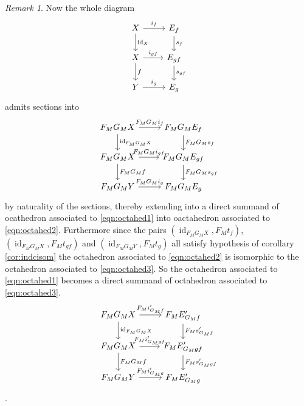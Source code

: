 \documentclass{article}
\DeclareMathOperator{\id}{id}
\theoremstyle{definition}
\theoremstyle{remark}
\newtheorem{remark}[theorem]{Remark}
\begin{document}
\begin{remark}
    Now the whole diagram 
    \begin{equation} \label{eqn:octahed1}
       \begin{tikzcd}
        X \arrow{r}{i_{f}} \arrow{d}{\id_{X}}  & E_{f} \arrow{d}{s_{f}}  \\
        X \arrow{r}{i_{gf}} \arrow{d}{f} & E_{gf} \arrow{d}{s_{gf}} \\
        Y \arrow{r}{i_{g}} & E_{g}
       \end{tikzcd}
    \end{equation} 
      admits sections into 
      \begin{equation} \label{eqn:octahed2}
        \begin{tikzcd}
        F_{M}G_{M}X \arrow{r}{F_{M}G_{M}i_{f}} \arrow{d}{\id_{F_{M}G_{M}X}}  & F_{M}G_{M}E_{f} \arrow{d}{F_{M}G_{M}s_{f}}  \\
        F_{M}G_{M}X \arrow{r}{F_{M}G_{M}i_{gf}} \arrow{d}{F_{M}G_{M}f} & F_{M}G_{M}E_{gf} \arrow{d}{F_{M}G_{M}s_{gf}} \\
        F_{M}G_{M}Y \arrow{r}{F_{M}G_{M}{i_{g}}} & F_{M}G_{M}E_{g}
     \end{tikzcd}
      \end{equation} 
      by naturality of the sections, thereby extending into a direct summand of ocathedron associated to \eqref{eqn:octahed1} into oactahedron associated to 
      \eqref{eqn:octahed2}. Furthermore since the pairs $(\id_{F_{M}G_{M}X}, F_{M}t_{f})$, $(\id_{F_{M}G_{M}X}, F_{M}t_{gf})$ 
      and $(\id_{F_{M}G_{M}Y},  F_{M}t_{g})$ all satisfy hypothesis of corollary \ref{cor:indcisom} the octahedron associated to \eqref{eqn:octahed2} is isomorphic to the octahedron associated to \eqref{eqn:octahed3}. So the octahedron associated to \eqref{eqn:octahed1} becomes a direct summand of octahedron associated to \eqref{eqn:octahed3}.
    \begin{equation} \label{eqn:octahed3}
     \begin{tikzcd}
        F_{M}G_{M}X \arrow{r}{F_{M}i'_{G_{M}f}} \arrow{d}{\id_{F_{M}G_{M}X}}  & F_{M}E'_{G_{M}f} \arrow{d}{F_{M}s'_{G_{M}f}}  \\
        F_{M}G_{M}X \arrow{r}{F_{M}i'_{G_{M}gf}} \arrow{d}{F_{M}G_{M}f} & F_{M}E'_{G_{M}gf} \arrow{d}{F_{M}s'_{G_{M}gf}} \\
        F_{M}G_{M}Y \arrow{r}{F_{M}i'_{G_{M}g}} & F_{M}E'_{G_{M}g}
     \end{tikzcd}
    \end{equation} .
\end{remark}
\end{document}
